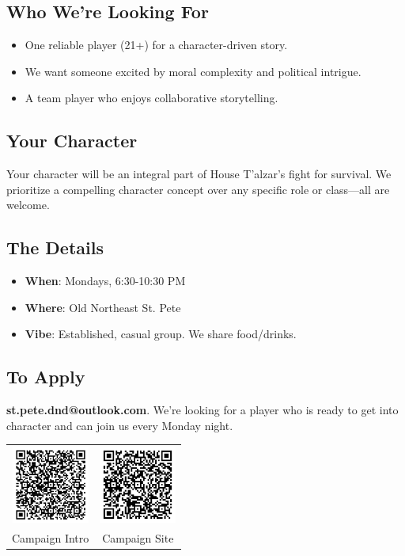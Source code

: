 \documentclass[a4paper, 8pt]{extarticle}
\begin{document}
\subsection*{\textbf{Who We're Looking For}}
\begin{itemize}
    \item One reliable player (21+) for a character-driven story.
    \item We want someone excited by moral complexity and political intrigue.
    \item A team player who enjoys collaborative storytelling.
\end{itemize}

\subsection*{\textbf{Your Character}}
Your character will be an integral part of House T’alzar’s fight for survival. We prioritize a compelling character concept over any specific role or class—all are welcome.

\subsection*{\textbf{The Details}}
\begin{itemize}
    \item \textbf{When}: Mondays, 6:30-10:30 PM
    \item \textbf{Where}: Old Northeast St. Pete
    \item \textbf{Vibe}: Established, casual group. We share food/drinks.
\end{itemize}

\subsection*{\textbf{To Apply}}
\textcolor{DragonRed}{\textbf{st.pete.dnd@outlook.com}}. We're looking for a player who is ready to get into character and can join us every Monday night.

\vspace{1cm}
\begin{table}[h!]
\centering
\begin{tabular}{cc}
\includegraphics[width=1in]{lmotd_google_docs_qr_code_transparent.png} & \includegraphics[width=1in]{lmotd_campaign_site_qr_code_transparent.png} \\
Campaign Intro & Campaign Site \\
\end{tabular}
\end{table}
\end{document}
